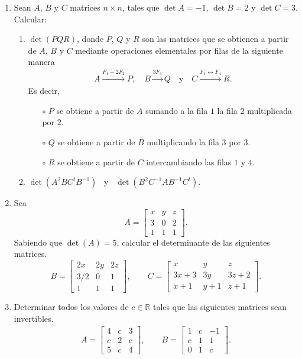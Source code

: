 \begin{enumerate}[topsep=6pt,itemsep=.4cm]
\item Sean $A$, $B$ y $C$ matrices $n\times n$, tales que $\det A=-1$, $\det B=2$ y $\det C=3$.
Calcular:

\begin{enumerate}
\item $\det(PQR)$, donde $P$, $Q$ y $R$ son las matrices que se obtienen a partir de $A$, $B$ y $C$ mediante operaciones elementales por filas de la siguiente manera
 \begin{align*}
 A\overset{F_1+2F_2}{\longrightarrow} P,\quad
 B\overset{3F_3}{\longrightarrow} Q
 \quad\mbox{y}\quad
 C\overset{F_1\leftrightarrow F_4}{\longrightarrow} R.
 \end{align*}
 Es decir,
 \begin{itemize}
  \item[$\circ$] $P$ se obtiene a partir de $A$ sumando a la fila $1$ la fila $2$ multiplicada por $2$.
  \item[$\circ$] $Q$ se obtiene a partir de $B$ multiplicando la fila $3$ por $3$.
  \item[$\circ$] $R$ se obtiene a partir de $C$ intercambiando las filas $1$ y $4$.
 \end{itemize}
	\item $\det(A^2BC^tB^{-1})$ \ y \ $\det(B^2C^{-1}AB^{-1}C^{t})$.
\end{enumerate}


\item  Sea
$$A=
\begin{bmatrix}
	x&y&z \\
	3&0&2\\
	1&1&1
\end{bmatrix}.$$
Sabiendo que $\det(A) = 5$, calcular el determinante de las siguientes matrices.
$$
B = \begin{bmatrix}
2x&2y&2z \\
3/2&0&1\\
1&1&1
\end{bmatrix}, \qquad
C=
\begin{bmatrix}
	x&y&z \\
	3x+3&3y&3z+2\\
	x+1&y+1&z+1
\end{bmatrix}.
$$


\item Determinar todos los valores de $c\in\mathbb{R}$ tales que las siguientes matrices sean invertibles.
\begin{align*}
A=\begin{bmatrix}4& c&3\\c&2&c\\ 5&c&4 \end{bmatrix},\qquad
B=\begin{bmatrix} 1&c&-1\\ c&1&1\\0&1&c\end{bmatrix}.
\end{align*}



\end{enumerate}
